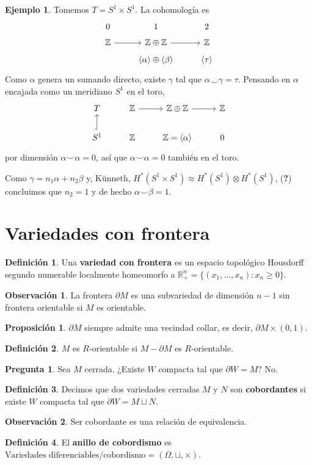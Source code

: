 \documentclass[spanish]{book}
\theoremstyle{definition}
\newtheorem*{defn}{Definición}
\newtheorem*{obs}{Observación}
\newtheorem*{prop}{Proposición}
\newtheorem*{ejem}{Ejemplo}
\newtheorem*{pregunta}{Pregunta}
\newcommand{\R}{\mathbb{R}}
\newcommand{\Z}{\mathbb{Z}}
\begin{document}
\begin{ejem}
	Tomemos $T=S^1\times S^1$. La cohomología es
	\[\begin{tikzcd}[row sep=tiny]
		0&1&2\\
		\Z\arrow[r]&\Z\oplus\Z\arrow[r]&\Z\\
		&\langle\alpha\rangle\oplus\langle\beta\rangle&\langle\tau\rangle
	\end{tikzcd}\]
	Como $\alpha$ genera un sumando directo, existe $\gamma$ tal que $\alpha\smile\gamma=\tau$. Pensando en $\alpha$ encajada como un meridiano $S^1$ en el toro,
	\[\begin{tikzcd}
		T&\Z\arrow[r]&\Z\oplus\Z\arrow[r]&\Z\\
		S^1\arrow[u,hook]&\Z&\Z= \langle\alpha\rangle&0
	\end{tikzcd}\]
	por dimensión $\alpha\smile\alpha=0$, así que 
	$\alpha\smile\alpha=0$ también en el toro.
	
	Como $\gamma=n_1\alpha+n_2\beta$ y,  Künneth, $H^*(S^1\times S^1)\approx H^*(S^1)\otimes H^*(S^1)$, (\textbf{?}) concluimos que $n_2=1$ y de hecho $\alpha\smile\beta=1$.
\end{ejem}

\section{Variedades con frontera}
\begin{defn}
	Una \textbf{variedad con frontera} es un espacio topológico Housdorff segundo numerable localmente homeomorfo a $\R^n_+=\{(x_1,\ldots,x_n):x_n\geq0\}$.
\end{defn}
\begin{obs}
	La frontera $\partial M$ es una subvariedad de dimensión $n-1$ sin frontera orientable si $M$ es orientable.
\end{obs}
\begin{prop}
	$\partial M$ siempre admite una vecindad collar, es decir, $\partial M\times(0,1)$.
\end{prop}
\begin{defn}
	 $M$ es $R$-orientable si $M-\partial M$ es $R$-orientable.
\end{defn}
\begin{pregunta}
	Sea $M$ cerrada. ¿Existe $W$ compacta tal que $\partial W=M$? No.
\end{pregunta}

\begin{defn}
	Decimos que dos variedades cerradas $M$ y $N$ son \textbf{cobordantes} si existe $W$ compacta tal que $\partial W=M\sqcup N$.
\end{defn}
\begin{obs}
	Ser cobordante es una relación de equivalencia.
\end{obs}
\begin{defn}
	El \textbf{anillo de cobordismo} es $\text{Variedades diferenciables}\Big/\text{cobordismo}=(\Omega,\sqcup,\times)$.
\end{defn}
\end{document}
